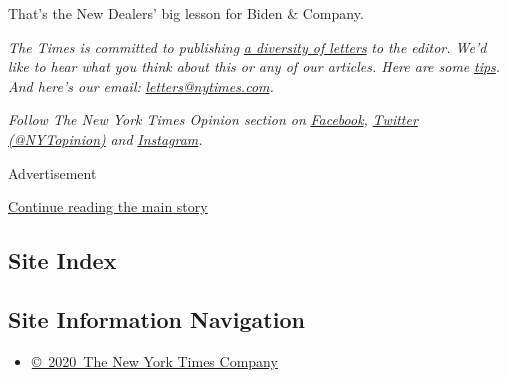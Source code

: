That's the New Dealers' big lesson for Biden \& Company.

\emph{The Times is committed to publishing}
\href{https://www.nytimes.com/2019/01/31/opinion/letters/letters-to-editor-new-york-times-women.html}{\emph{a
diversity of letters}} \emph{to the editor. We'd like to hear what you
think about this or any of our articles. Here are some}
\href{https://help.nytimes.com/hc/en-us/articles/115014925288-How-to-submit-a-letter-to-the-editor}{\emph{tips}}\emph{.
And here's our email:}
\href{mailto:letters@nytimes.com}{\emph{letters@nytimes.com}}\emph{.}

\emph{Follow The New York Times Opinion section on}
\href{https://www.facebook.com/nytopinion}{\emph{Facebook}}\emph{,}
\href{http://twitter.com/NYTOpinion}{\emph{Twitter (@NYTopinion)}}
\emph{and}
\href{https://www.instagram.com/nytopinion/}{\emph{Instagram}}\emph{.}

Advertisement

\protect\hyperlink{after-bottom}{Continue reading the main story}

\hypertarget{site-index}{%
\subsection{Site Index}\label{site-index}}

\hypertarget{site-information-navigation}{%
\subsection{Site Information
Navigation}\label{site-information-navigation}}

\begin{itemize}
\tightlist
\item
  \href{https://help.nytimes.com/hc/en-us/articles/115014792127-Copyright-notice}{©~2020~The
  New York Times Company}
\end{itemize}


